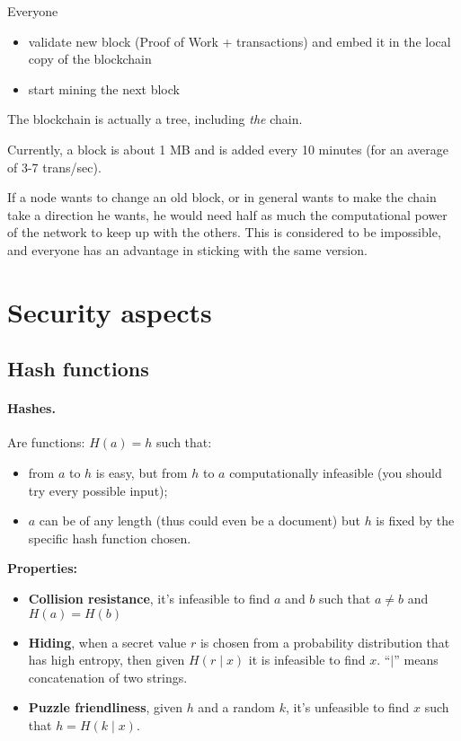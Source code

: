 Everyone
\begin{itemize}
	\item validate new block (Proof of Work + transactions) and embed it in the local copy of the blockchain
	\item start mining the next block
\end{itemize}

The blockchain is actually a tree, including \emph{the} chain.

Currently, a block is about 1 MB and is added every 10 minutes (for an average of 3-7 trans/sec).

If a node wants to change an old block, or in general wants to make the chain take a direction he wants, he would need half as much the computational power of the network to keep up with the others. This is considered to be impossible, and everyone has an advantage in sticking with the same version.

\section{Security aspects}

\subsection{Hash functions}

\paragraph*{Hashes.} Are functions: $H(a)=h$ such that:
\begin{itemize}
	\item from $a$ to $h$ is easy, but from $h$ to $a$ computationally infeasible (you should try every possible input);
	\item $a$ can be of any length (thus could even be a document) but $h$ is fixed by the specific hash function chosen.
\end{itemize}

\textbf{Properties:}
\begin{itemize}
	\item \textbf{Collision resistance}, it's infeasible to find $a$ and $b$ such that $a\neq b$ and $H(a)=H(b)$
	\item \textbf{Hiding}, when a secret value $r$ is chosen from a probability distribution that has high entropy, then given $H(r\mid x)$ it is infeasible to find $x$. ``$\mid$'' means concatenation of two strings.
	\item \textbf{Puzzle friendliness}, given $h$ and a random $k$, it's unfeasible to find $x$ such that $h=H(k\mid x)$.
\end{itemize}

